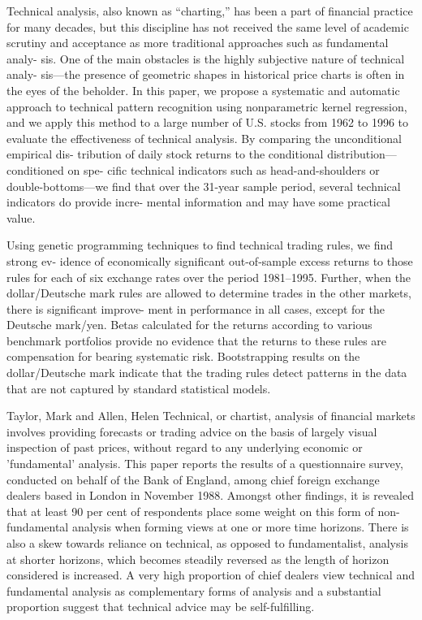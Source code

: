 \cite{Lo2000} Technical analysis, also known as “charting,” has been a part of
financial practice for many decades, but this discipline has not received the
same level of academic scrutiny and acceptance as more traditional approaches
such as fundamental analy- sis. One of the main obstacles is the highly
subjective nature of technical analy- sis—the presence of geometric shapes in
historical price charts is often in the eyes of the beholder. In this paper, we
propose a systematic and automatic approach to technical pattern recognition
using nonparametric kernel regression, and we apply this method to a large
number of U.S. stocks from 1962 to 1996 to evaluate the effectiveness of
technical analysis. By comparing the unconditional empirical dis- tribution of
daily stock returns to the conditional distribution—conditioned on spe- cific
technical indicators such as head-and-shoulders or double-bottoms—we find that
over the 31-year sample period, several technical indicators do provide incre-
mental information and may have some practical value.

\cite{Neely1997} Using genetic programming techniques to find technical trading
rules, we find strong ev- idence of economically significant out-of-sample
excess returns to those rules for each of six exchange rates over the period
1981–1995. Further, when the dollar/Deutsche mark rules are allowed to determine
trades in the other markets, there is significant improve- ment in performance
in all cases, except for the Deutsche mark/yen. Betas calculated for the returns
according to various benchmark portfolios provide no evidence that the returns
to these rules are compensation for bearing systematic risk. Bootstrapping
results on the dollar/Deutsche mark indicate that the trading rules detect
patterns in the data that are not captured by standard statistical models.

Taylor, Mark and Allen, Helen \cite{Fund1992} Technical, or chartist, analysis of
financial markets involves providing forecasts or trading advice on the basis of
largely visual inspection of past prices, without regard to any underlying
economic or 'fundamental' analysis. This paper reports the results of a
questionnaire survey, conducted on behalf of the Bank of England, among chief
foreign exchange dealers based in London in November 1988. Amongst other
findings, it is revealed that at least 90 per cent of respondents place some
weight on this form of non-fundamental analysis when forming views at one or
more time horizons. There is also a skew towards reliance on technical, as
opposed to fundamentalist, analysis at shorter horizons, which becomes steadily
reversed as the length of horizon considered is increased. A very high
proportion of chief dealers view technical and fundamental analysis as
complementary forms of analysis and a substantial proportion suggest that
technical advice may be self-fulfilling.


